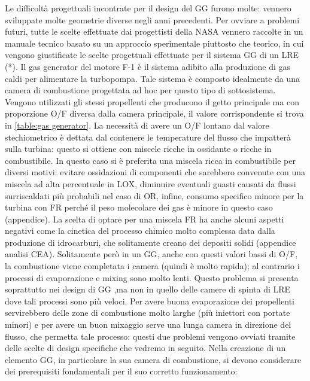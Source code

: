 \documentclass[11pt,a4paper]{article}
\begin{document}
\label{sec:gas generator}

Le difficoltà progettuali incontrate per il design del GG furono molte: vennero sviluppate molte geometrie diverse negli anni precedenti. Per ovviare a problemi futuri, tutte le scelte effettuate dai progettisti della NASA vennero raccolte in un manuale tecnico basato su un approccio sperimentale piuttosto che teorico, in cui vengono giustificate le scelte progettuali effettuate per il sistema GG di un LRE (*).
Il gas generator del motore F-1 è il sistema adibito alla produzione di gas caldi per alimentare la turbopompa. Tale sistema è composto idealmente da una camera di combustione progettata ad hoc per questo tipo di sottosistema. Vengono utilizzati gli stessi propellenti che producono il getto principale ma con proporzione O/F diversa dalla camera principale, il valore corrispondente si trova in \autoref{table:gas generator}. La necessità di avere un O/F lontano dal valore stechiometrico è dettata dal contenere le temperature del flusso che impatterà sulla turbina: questo si ottiene con miscele ricche in ossidante o ricche in combustibile. In questo caso si è preferita una miscela ricca in combustibile per diversi motivi: evitare ossidazioni di componenti che sarebbero convenute con una miscela ad alta percentuale in LOX, diminuire eventuali guasti causati da flussi surriscaldati più probabili nel caso di OR, infine, consumo specifico minore per la turbina con FR perché il peso molecolare dei gas è minore in questo caso (appendice). La scelta di optare per una miscela FR ha anche alcuni aspetti negativi come la cinetica del processo chimico molto complessa data dalla produzione di idrocarburi, che solitamente creano dei depositi solidi (appendice analisi CEA). Solitamente però in un GG, anche con questi valori bassi di O/F,  la combustione viene completata i camera (quindi è molto rapida); al contrario i processi di evaporazione e mixing sono molto lenti. Questo problema si presenta soprattutto nei design di GG ,ma non in quello delle camere di spinta di LRE dove tali processi sono più veloci. Per avere buona evaporazione dei propellenti servirebbero delle zone di combustione molto larghe (più iniettori con portate minori) e per avere un buon mixaggio serve una lunga camera in direzione del flusso, che permetta tale processo: questi due problemi vengono ovviati tramite delle scelte di design specifiche che vedremo in seguito. 
Nella creazione di un elemento GG, in particolare la sua camera di combustione, si devono considerare dei prerequisiti fondamentali per il suo corretto funzionamento:
\end{document}
